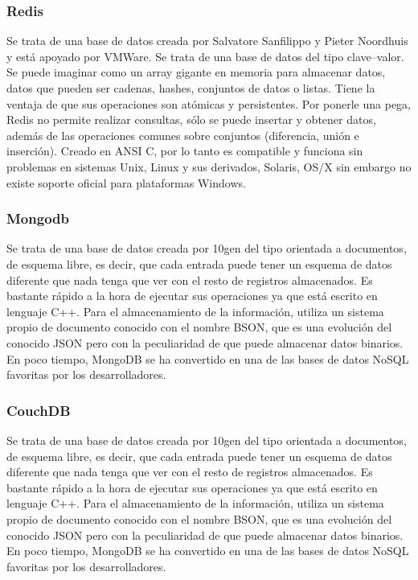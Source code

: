 \documentclass[twoside,twocolumn]{article}
\begin{document}
\subsubsection{Redis}
Se trata de una base de datos creada por 
Salvatore Sanfilippo y Pieter Noordhuis y está 
apoyado por VMWare. Se trata de una base de datos del tipo clave–valor.
 Se puede imaginar como un array gigante en memoria para almacenar datos,
  datos que pueden ser cadenas, hashes, conjuntos de datos o listas. Tiene 
  la ventaja de que sus operaciones son atómicas y persistentes. Por ponerle 
  una pega, Redis no permite realizar consultas, sólo se puede insertar y
   obtener datos, además de las operaciones comunes sobre conjuntos 
   (diferencia, unión e inserción). Creado en ANSI C, por lo tanto es 
   compatible y funciona sin problemas en sistemas Unix, Linux y sus derivados,
    Solaris, OS/X sin 
embargo no existe soporte oficial para plataformas Windows.
\subsubsection{Mongodb}
Se trata de una base de datos creada por 10gen del tipo orientada a documentos, 
de esquema libre, es decir, que cada entrada puede tener un esquema de datos 
diferente que nada tenga que ver con el resto de registros almacenados. 
Es bastante rápido a la hora de ejecutar sus operaciones ya que está escrito
 en lenguaje C++. Para el almacenamiento de la información, utiliza un sistema
  propio de documento conocido con el nombre BSON, que es una evolución del 
  conocido JSON pero con la peculiaridad de que puede almacenar datos binarios.
   En poco tiempo, MongoDB se ha convertido en
 una de las bases de datos NoSQL favoritas por los desarrolladores.
\subsubsection{CouchDB}
Se trata de una base de datos creada por 10gen del tipo orientada a 
documentos, de esquema libre, es decir, que cada entrada puede tener 
un esquema de datos diferente que nada tenga que ver con el resto de 
registros almacenados. Es bastante rápido a la hora de ejecutar sus 
operaciones ya que está escrito en lenguaje C++. Para el almacenamiento 
de la información, utiliza un sistema propio de documento conocido con el
 nombre BSON, que es una evolución del conocido JSON pero con la peculiaridad
  de que puede almacenar datos binarios. En poco tiempo, MongoDB se ha convertido 
en una de las bases de datos NoSQL favoritas por los desarrolladores.
\end{document}
